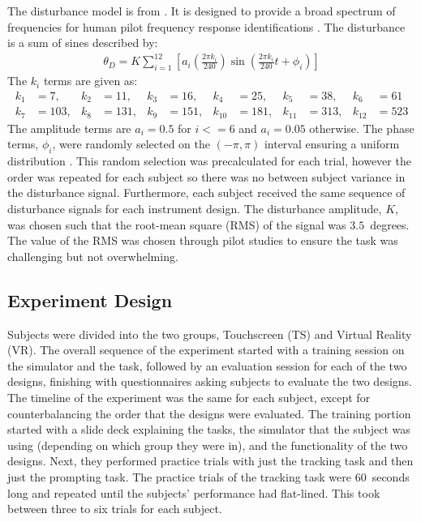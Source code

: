 The disturbance model is from \citet{sweet_identification_1999}.
It is designed to provide a broad spectrum of frequencies for human pilot frequency response identifications \citep{mcruer_mathematical_1974}.
The disturbance is a sum of sines described by:
\begin{align}
    \theta_D = K\sum\limits_{i=1}^{12} \left[ a_i \left(\frac{2\pi k_i}{240} \right) \sin\left( \frac{2\pi k_i}{240}t + \phi_i \right) \right]
\end{align}
The $k_i$ terms are given as:
\begin{align*}
    k_1 &= 7,   & k_2 &= 11,  & k_3 &= 16,  & k_4    &= 25,  & k_5    &= 38,  & k_6    &= 61 \\
    k_7 &= 103, & k_8 &= 131, & k_9 &= 151, & k_{10} &= 181, & k_{11} &= 313, & k_{12} &= 523
\end{align*}
The amplitude terms are $a_i=0.5$ for $i <= 6$ and $a_i=0.05$ otherwise.
The phase terms, $\phi_i$, were randomly selected on the $(-\pi, \pi)$ interval ensuring a uniform distribution \citep{sweet_identification_1999}.
This random selection was precalculated for each trial, however the order was repeated for each subject so there was no between subject variance in the disturbance signal.
Furthermore, each subject received the same sequence of disturbance signals for each instrument design.
The disturbance amplitude, $K$, was chosen such that the root-mean square (RMS) of the signal was $3.5$~degrees.
The value of the RMS was chosen through pilot studies to ensure the task was challenging but not overwhelming.

\subsection{Experiment Design}

Subjects were divided into the two groups, Touchscreen (TS) and Virtual Reality (VR).
The overall sequence of the experiment started with a training session on the simulator and the task, followed by an evaluation session for each of the two designs, finishing with questionnaires asking subjects to evaluate the two designs.
The timeline of the experiment was the same for each subject, except for counterbalancing the order that the designs were evaluated.
The training portion started with a slide deck explaining the tasks, the simulator that the subject was using (depending on which group they were in), and the functionality of the two designs.
Next, they performed practice trials with just the tracking task and then just the prompting task.
The practice trials of the tracking task were 60~seconds long and repeated until the subjects' performance had flat-lined.
This took between three to six trials for each subject.

